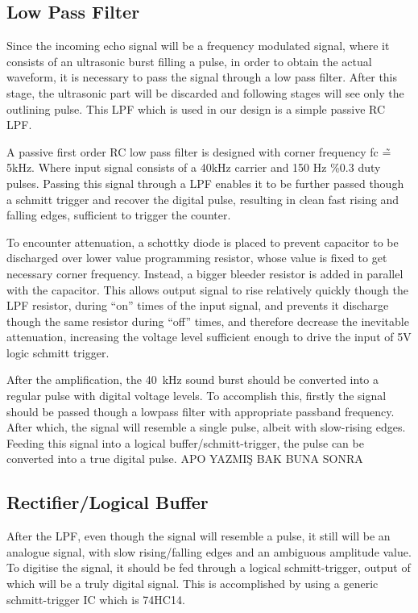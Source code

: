 \documentclass[12pt, a4paper]{article}
\begin{document}
	
	\subsection{Low Pass Filter}
	Since the incoming echo signal will be a frequency modulated signal, where it consists of an ultrasonic burst filling a pulse, in order to obtain the actual waveform, it is necessary to pass the signal through a low pass filter. 
	After this stage, the ultrasonic part will be discarded and following stages will see only the outlining pulse. This LPF which is used in our design is a simple passive RC LPF.
	
	\bigskip
	A passive first order RC low pass filter is designed with corner frequency fc \~= 5kHz. Where input signal consists of a 40kHz carrier and 150 Hz \%0.3 duty pulses. Passing this signal through a LPF enables it to be further passed though a schmitt trigger and recover the digital pulse, resulting in clean fast rising and falling edges, sufficient to trigger the counter.
	
	\bigskip
	To encounter attenuation, a schottky diode is placed to prevent capacitor to be discharged over lower value programming resistor, whose value is fixed to get necessary corner frequency. Instead, a bigger bleeder resistor is added in parallel with the capacitor. This allows output signal to rise relatively quickly though the LPF resistor, during “on” times of the input signal, and prevents it discharge though the same resistor during “off” times, and therefore decrease the inevitable attenuation, increasing the voltage level sufficient enough to drive the input of 5V logic schmitt trigger.
	
	 \bigskip
    After the amplification, the \SI{40}{\kilo\hertz} sound burst should be converted into a regular pulse with digital voltage levels. To accomplish this, firstly the signal should be passed though a lowpass filter with appropriate passband frequency. After which, the signal will resemble a single pulse, albeit with slow-rising edges. Feeding this signal into a logical buffer/schmitt-trigger, the pulse can be converted into a true digital pulse.  APO YAZMIŞ BAK BUNA SONRA

	\subsection{Rectifier/Logical Buffer}
	After the LPF, even though the signal will resemble a pulse, it still will be an analogue signal, with slow rising/falling edges and an ambiguous amplitude value. To digitise the signal, it should be fed through a logical schmitt-trigger, output of which will be a truly digital signal. This is accomplished by using a generic schmitt-trigger IC which is 74HC14.
\end{document}
